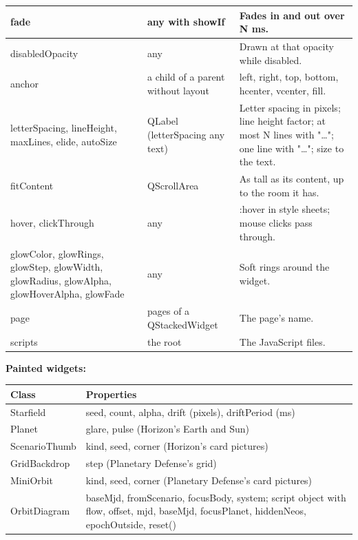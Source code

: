 \documentclass[Orbiter Developer Manual.tex]{subfiles}
\begin{document}
\begin{sloppypar}
\begin{longtable}{ |p{}|p{}|p{}| }
	\hline\rule{0pt}{2ex}
	fade & any with showIf & Fades in and out over N ms.\\
	\hline\rule{0pt}{2ex}
	disabledOpacity & any & Drawn at that opacity while disabled.\\
	\hline\rule{0pt}{2ex}
	anchor & a child of a parent without layout & left, right, top, bottom, hcenter, vcenter, fill.\\
	\hline\rule{0pt}{2ex}
	letterSpacing, lineHeight, maxLines, elide, autoSize & QLabel (letterSpacing any text) & Letter spacing in pixels; line height factor; at most N lines with "\ldots"; one line with "\ldots"; size to the text.\\
	\hline\rule{0pt}{2ex}
	fitContent & QScrollArea & As tall as its content, up to the room it has.\\
	\hline\rule{0pt}{2ex}
	hover, clickThrough & any & :hover in style sheets; mouse clicks pass through.\\
	\hline\rule{0pt}{2ex}
	glowColor, glowRings, glowStep, glowWidth, glowRadius, glowAlpha, glowHoverAlpha, glowFade & any & Soft rings around the widget.\\
	\hline\rule{0pt}{2ex}
	page & pages of a QStackedWidget & The page's name.\\
	\hline\rule{0pt}{2ex}
	scripts & the root & The JavaScript files.\\
	\hline
	\end{longtable}

\noindent
\textbf{Painted widgets:}

	\begin{longtable}{ |p{}|p{}| }
	\hline\rule{0pt}{2ex}
	\textbf{Class} & \textbf{Properties}\\
	\hline\rule{0pt}{2ex}
	Starfield & seed, count, alpha, drift (pixels), driftPeriod (ms)\\
	\hline\rule{0pt}{2ex}
	Planet & glare, pulse (Horizon's Earth and Sun)\\
	\hline\rule{0pt}{2ex}
	ScenarioThumb & kind, seed, corner (Horizon's card pictures)\\
	\hline\rule{0pt}{2ex}
	GridBackdrop & step (Planetary Defense's grid)\\
	\hline\rule{0pt}{2ex}
	MiniOrbit & kind, seed, corner (Planetary Defense's card pictures)\\
	\hline\rule{0pt}{2ex}
	OrbitDiagram & baseMjd, fromScenario, focusBody, system; script object with flow, offset, mjd, baseMjd, focusPlanet, hiddenNeos, epochOutside, reset()\\
	\hline
	\end{longtable}


\end{sloppypar}
\end{document}
